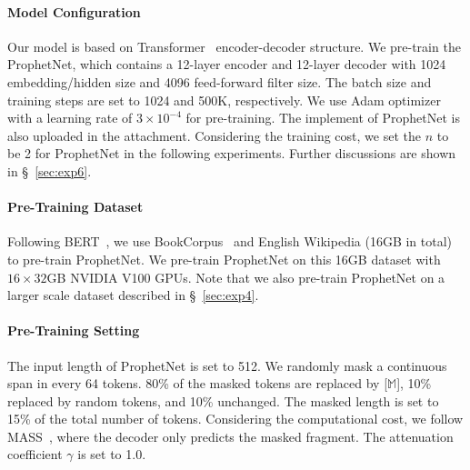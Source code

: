 \documentclass[11pt,a4paper]{article}
\begin{document}
\paragraph{Model Configuration} 
Our model is based on Transformer~\cite{vaswani2017attention} encoder-decoder structure. 
We pre-train the ProphetNet, which contains a 12-layer encoder and 12-layer decoder with 1024 embedding/hidden size and 4096 feed-forward filter size. The batch size and training steps are set to 1024 and 500K, respectively. 
We use Adam optimizer~\cite{kingma2014adam} with a learning rate of $3 \times 10^{-4}$ for pre-training. 
The implement of ProphetNet is also uploaded in the attachment.
Considering the training cost, we set the $n$ to be 2 for ProphetNet in the following experiments. Further discussions are shown in \S~\ref{sec:exp6}.


\paragraph{Pre-Training Dataset} 
Following BERT~\cite{devlin2018bert}, we use BookCorpus~\cite{zhu2015aligning} and English Wikipedia (16GB in total) to pre-train ProphetNet.
We pre-train ProphetNet on this 16GB dataset with $16 \times 32$GB NVIDIA V100 GPUs.
Note that we also pre-train ProphetNet on a larger scale dataset described in \S~\ref{sec:exp4}.


\paragraph{Pre-Training Setting}
The input length of ProphetNet is set to 512.
We randomly mask a continuous span in every 64 tokens. 
80\% of the masked tokens are replaced by [$\mathbb{M}$], 10\% replaced by random tokens, and 10\% unchanged. 
The masked length is set to 15\% of the total number of tokens. Considering the computational cost, we follow MASS~\cite{song2019mass}, where the decoder only predicts the masked fragment. The attenuation coefficient $\gamma$ is set to 1.0.
\end{document}
